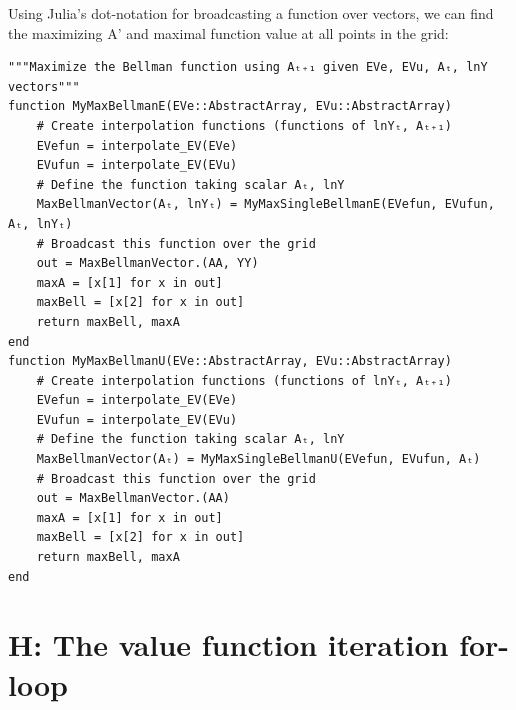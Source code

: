 \documentclass[12pt]{article}
\begin{document}
Using Julia's dot-notation for broadcasting a function over vectors, we can find the maximizing A' and maximal function value at all points in the grid:
\begin{lstlisting}[language=JuliaLocal, style=julia]
"""Maximize the Bellman function using Aₜ₊₁ given EVe, EVu, Aₜ, lnY vectors"""
function MyMaxBellmanE(EVe::AbstractArray, EVu::AbstractArray)
    # Create interpolation functions (functions of lnYₜ, Aₜ₊₁)
    EVefun = interpolate_EV(EVe)
    EVufun = interpolate_EV(EVu)
    # Define the function taking scalar Aₜ, lnY
    MaxBellmanVector(Aₜ, lnYₜ) = MyMaxSingleBellmanE(EVefun, EVufun, Aₜ, lnYₜ)
    # Broadcast this function over the grid
    out = MaxBellmanVector.(AA, YY)
    maxA = [x[1] for x in out]
    maxBell = [x[2] for x in out]
    return maxBell, maxA
end
function MyMaxBellmanU(EVe::AbstractArray, EVu::AbstractArray)
    # Create interpolation functions (functions of lnYₜ, Aₜ₊₁)
    EVefun = interpolate_EV(EVe)
    EVufun = interpolate_EV(EVu)
    # Define the function taking scalar Aₜ, lnY
    MaxBellmanVector(Aₜ) = MyMaxSingleBellmanU(EVefun, EVufun, Aₜ)
    # Broadcast this function over the grid
    out = MaxBellmanVector.(AA)
    maxA = [x[1] for x in out]
    maxBell = [x[2] for x in out]
    return maxBell, maxA
end
\end{lstlisting}










\newpage
\section*{H: The value function iteration for-loop}
\end{document}
